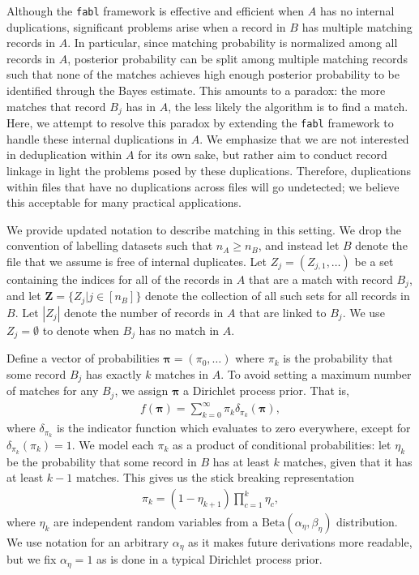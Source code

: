 \documentclass[12pt,letterpaper]{article}
\newcommand{\1}[1]{\mathbb{I}\!\left[#1\right]} %
\begin{document}
Although the \texttt{fabl} framework is effective and efficient when $A$ has no internal duplications, significant problems arise when a record in $B$ has multiple matching records in $A$. In particular, since matching probability is normalized among all records in $A$, posterior probability can be split among multiple matching records such that none of the matches achieves high enough posterior probability to be identified through the Bayes estimate. This amounts to a paradox: the more matches that record $B_j$ has in $A$, the less likely the algorithm is to find a match. Here, we attempt to resolve this paradox by extending the \texttt{fabl} framework to handle these internal duplications in $A$. We emphasize that we are not interested in deduplication within $A$ for its own sake, but rather aim to conduct record linkage in light the problems posed by these duplications. Therefore, duplications within files that have no duplications across files will go undetected; we believe this acceptable for many practical applications. 

We provide updated notation to describe matching in this setting. We drop the convention of labelling datasets such that $n_A \geq n_B$, and instead let $B$ denote the file that we assume is free of internal duplicates. Let $Z_j = (Z_{j, 1}, \ldots)$ be a set containing the indices for all of the records in $A$ that are a match with record $B_j$, and let $\bm{Z} = \{Z_j | j \in [n_B] \}$ denote the collection of all such sets for all records in $B$. Let $|Z_j|$ denote the number of records in $A$ that are linked to $B_j$. We use $Z_j = \emptyset$ to denote when $B_j$ has no match in $A$. 

Define a vector of probabilities $\bm{\pi} = (\pi_0, \ldots)$ where $\pi_k$ is the probability that some record $B_j$ has exactly $k$ matches in $A$. To avoid setting a maximum number of matches for any $B_j$, we assign $\bm{\pi}$ a Dirichlet process prior. That is, 
\begin{align}\label{eqn:pi-dirichlet-process}
	f(\bm{\pi}) = \sum_{k=0}^{\infty} \pi_k \delta_{\pi_k}(\bm{\pi}),
\end{align}
where $\delta_{\pi_k}$ is the indicator function which evaluates to zero everywhere, except for $\delta_{\pi_k}(\pi_k) = 1$. We model each $\pi_k$ as a product of conditional probabilities: let $\eta_k$ be the probability that some record in $B$ has at least $k$ matches, given that it has at least $k-1$ matches. This gives us the stick breaking representation
\begin{align}\label{eqn:pi-stick-breaking}
	\pi_k = (1 - \eta_{k+1}) \prod_{c=1}^{k} \eta_c, 
\end{align}
where $\eta_k$ are independent random variables from a $\text{Beta}(\alpha_{\eta}, \beta_{\eta})$ distribution. We use notation for an arbitrary $\alpha_{\eta}$ as it makes future derivations more readable, but we fix $\alpha_{\eta} = 1$ as is done in a typical Dirichlet process prior. 
\end{document}
